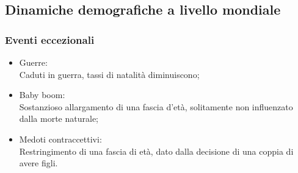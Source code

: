 \documentclass{article}
\begin{document}
\subsection{Dinamiche demografiche a livello mondiale}
\subsubsection{Eventi eccezionali}
\begin{itemize}
    \item Guerre:\\
        Caduti in guerra, tassi di natalità diminuiscono;
    \item Baby boom:\\
        Sostanzioso allargamento di una fascia d'età, solitamente non influenzato dalla
        morte naturale;
    \item Medoti contraccettivi:\\
        Restringimento di una fascia di età, dato dalla decisione di una coppia di avere figli.
\end{itemize}
\phantom{}
\end{document}
